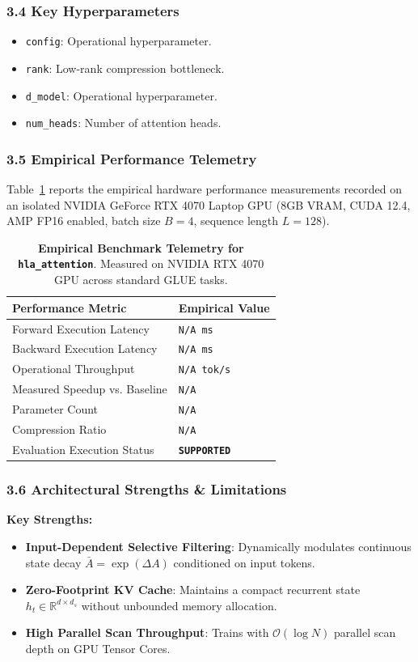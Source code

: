 \subsubsection*{3.4 Key Hyperparameters}
\begin{itemize}
    \item \texttt{config}: Operational hyperparameter.
    \item \texttt{rank}: Low-rank compression bottleneck.
    \item \texttt{d\_model}: Operational hyperparameter.
    \item \texttt{num\_heads}: Number of attention heads.
\end{itemize}

\subsubsection*{3.5 Empirical Performance Telemetry}
Table~\ref{tab:telemetry_hla_attention} reports the empirical hardware performance measurements recorded on an isolated NVIDIA GeForce RTX 4070 Laptop GPU (8GB VRAM, CUDA 12.4, AMP FP16 enabled, batch size $B=4$, sequence length $L=128$).

\begin{table}[h]
\centering
\small
\caption{\textbf{Empirical Benchmark Telemetry for \texttt{hla\_attention}}. Measured on NVIDIA RTX 4070 GPU across standard GLUE tasks.}
\label{tab:telemetry_hla_attention}
\begin{tabularx}{\columnwidth}{lX}
\toprule
\textbf{Performance Metric} & \textbf{Empirical Value} \\
\midrule
Forward Execution Latency & \texttt{N/A ms} \\
Backward Execution Latency & \texttt{N/A ms} \\
Operational Throughput & \texttt{N/A tok/s} \\
Measured Speedup vs. Baseline & \texttt{N/A} \\
Parameter Count & \texttt{N/A} \\
Compression Ratio & \texttt{N/A} \\
Evaluation Execution Status & \textbf{\texttt{SUPPORTED}} \\
\bottomrule
\end{tabularx}
\end{table}

\subsubsection*{3.6 Architectural Strengths \& Limitations}
\textbf{Key Strengths:}
\begin{itemize}
    \item \textbf{Input-Dependent Selective Filtering}: Dynamically modulates continuous state decay $\bar{A} = \exp(\Delta A)$ conditioned on input tokens.
    \item \textbf{Zero-Footprint KV Cache}: Maintains a compact recurrent state $h_t \in \mathbb{R}^{d \times d_s}$ without unbounded memory allocation.
    \item \textbf{High Parallel Scan Throughput}: Trains with $\mathcal{O}(\log N)$ parallel scan depth on GPU Tensor Cores.
\end{itemize}

